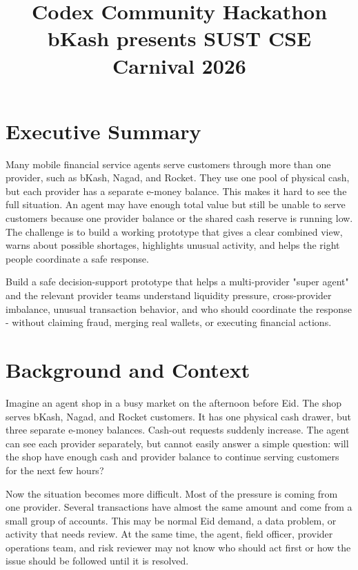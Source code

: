 \documentclass[11pt,a4paper]{article}
\title{\textbf{Codex Community Hackathon}\\ \large bKash presents SUST CSE Carnival 2026}
\author{}
\date{}
\begin{document}
\maketitle
\thispagestyle{empty}


\section{Executive Summary}
Many mobile financial service agents serve customers through more than one provider, such as bKash, Nagad, and Rocket. They use one pool of physical cash, but each provider has a separate e-money balance. This makes it hard to see the full situation. An agent may have enough total value but still be unable to serve customers because one provider balance or the shared cash reserve is running low. The challenge is to build a working prototype that gives a clear combined view, warns about possible shortages, highlights unusual activity, and helps the right people coordinate a safe response.

Build a safe decision-support prototype that helps a multi-provider "super agent" and the relevant provider teams understand liquidity pressure, cross-provider imbalance, unusual transaction behavior, and who should coordinate the response - without claiming fraud, merging real wallets, or executing financial actions.

\section{Background and Context}
Imagine an agent shop in a busy market on the afternoon before Eid. The shop serves bKash, Nagad, and Rocket customers. It has one physical cash drawer, but three separate e-money balances. Cash-out requests suddenly increase. The agent can see each provider separately, but cannot easily answer a simple question: will the shop have enough cash and provider balance to continue serving customers for the next few hours?

Now the situation becomes more difficult. Most of the pressure is coming from one provider. Several transactions have almost the same amount and come from a small group of accounts. This may be normal Eid demand, a data problem, or activity that needs review. At the same time, the agent, field officer, provider operations team, and risk reviewer may not know who should act first or how the issue should be followed until it is resolved.
\end{document}
